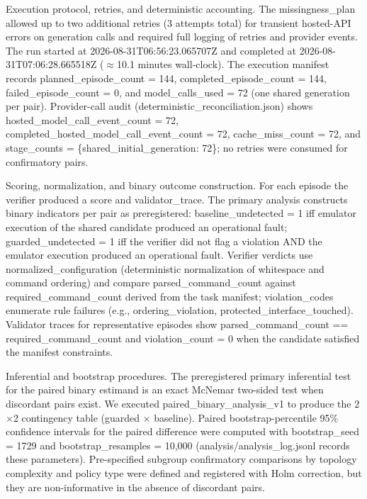 \documentclass[conference]{IEEEtran}
\begin{document}
Execution protocol, retries, and deterministic accounting. The missingness\_plan allowed up to two additional retries (3 attempts total) for transient hosted-API errors on generation calls and required full logging of retries and provider events. The run started at 2026-08-31T06:56:23.065707Z and completed at 2026-08-31T07:06:28.665518Z (\ensuremath{\approx}10.1 minutes wall-clock). The execution manifest records planned\_episode\_count = 144, completed\_episode\_count = 144, failed\_episode\_count = 0, and model\_calls\_used = 72 (one shared generation per pair). Provider-call audit (deterministic\_reconciliation.json) shows hosted\_model\_call\_event\_count = 72, completed\_hosted\_model\_call\_event\_count = 72, cache\_miss\_count = 72, and stage\_counts = \{shared\_initial\_generation: 72\}; no retries were consumed for confirmatory pairs.

Scoring, normalization, and binary outcome construction. For each episode the verifier produced a score and validator\_trace. The primary analysis constructs binary indicators per pair as preregistered: baseline\_undetected = 1 iff emulator execution of the shared candidate produced an operational fault; guarded\_undetected = 1 iff the verifier did not flag a violation AND the emulator execution produced an operational fault. Verifier verdicts use normalized\_configuration (deterministic normalization of whitespace and command ordering) and compare parsed\_command\_count against required\_command\_count derived from the task manifest; violation\_codes enumerate rule failures (e.g., ordering\_violation, protected\_interface\_touched). Validator traces for representative episodes show parsed\_command\_count == required\_command\_count and violation\_count = 0 when the candidate satisfied the manifest constraints.

Inferential and bootstrap procedures. The preregistered primary inferential test for the paired binary estimand is an exact McNemar two-sided test when discordant pairs exist. We executed paired\_binary\_analysis\_v1 to produce the 2\ensuremath{\times}2 contingency table (guarded \ensuremath{\times} baseline). Paired bootstrap-percentile 95\% confidence intervals for the paired difference were computed with bootstrap\_seed = 1729 and bootstrap\_resamples = 10,000 (analysis/analysis\_log.jsonl records these parameters). Pre-specified subgroup confirmatory comparisons by topology complexity and policy type were defined and registered with Holm correction, but they are non-informative in the absence of discordant pairs.
\end{document}
